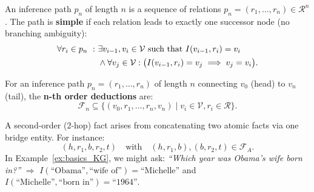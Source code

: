             \begin{definition}
                \label{def:inference_path}
                An inference path \(p_n\) of length \(n\) is a sequence of relations 
                \(p_n = (r_1, \dots, r_n) \in \mathcal{R}^n\).
                The path is \textbf{simple} if each relation leads to exactly one successor node (no branching ambiguity):
                \begin{align*}
                    \forall r_i \in p_n\ :\ &\exists v_{i-1}, v_i \in \mathcal{V} \text{ such that } I(v_{i-1}, r_i) = v_i\notag \\
                    &  \land 
                    \forall v_j \in \mathcal{V}: \bigl( I(v_{i-1}, r_i) = v_j \implies v_j = v_i\bigr).
                \end{align*}
            \end{definition}
            
            \begin{definition}
                \label{def:nth_order}
                For an inference path \(p_n=(r_1,\dots,r_n)\) of length \(n\) connecting
                \(v_0\) (head) to \(v_n\) (tail), the \textbf{n-th order deductions} are:
                \[
                    \mathcal{F}_n 
                    \subseteq
                    \bigl\{
                        (v_0, r_1,\dots,r_n, v_n)
                        \;|\;
                        v_i\in\mathcal{V}, 
                        r_i\in\mathcal{R}
                    \bigr\}.
                \]
            \end{definition}
            
            \begin{example}
                \label{ex:2hop_deductions}
                A second-order (2-hop) fact arises from concatenating two atomic facts via one bridge entity. For instance:
                \[
                    (h, r_1, b, r_2, t)\quad\text{with}\quad (h,r_1,b),(b,r_2,t)\in\mathcal{F}_A.
                \]
                In Example~\ref{ex:basics_KG}, we might ask:
                \emph{``Which year was Obama's wife born in?''}
                \(\Rightarrow\)
                \(
                    I(\text{``Obama''},\text{``wife of''})=\text{``Michelle''}
                \)
                and
                \(
                    I(\text{``Michelle''},\text{``born in''})=\text{``1964''}.
                \)
            \end{example}
            
